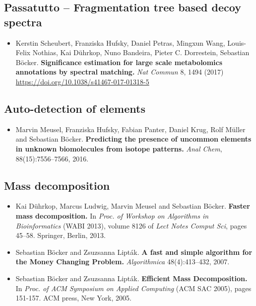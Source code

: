 \documentclass[letterpaper,10pt,openany,oneside]{sphinxmanual}
\begin{document}
\subsection*{Passatutto -- Fragmentation tree based decoy spectra}
\label{introduction:passatutto}
\begin{itemize}
	\item Kerstin Scheubert, Franziska Hufsky, Daniel Petras, Mingxun Wang, Louis-Felix Nothias, Kai Dührkop, Nuno Bandeira, Pieter C. Dorrestein, Sebastian Böcker.
	\textbf{Significance estimation for large scale metabolomics annotations by spectral matching.}
	\emph{Nat Commun} 8, 1494 (2017)  \url{https://doi.org/10.1038/s41467-017-01318-5}
\end{itemize}

\subsection*{Auto-detection of elements}
\label{introduction:auto-detection-of-elements}

\begin{itemize}
\item Marvin Meusel, Franziska Hufsky, Fabian Panter, Daniel Krug, Rolf Müller and Sebastian Böcker.
\textbf{Predicting the presence of uncommon elements in unknown biomolecules from isotope patterns.}
\emph{Anal Chem}, 88(15):7556--7566, 2016. 
\end{itemize}

\subsection*{Mass decomposition}
\label{introduction:mass-decomposition}

\begin{itemize}
\item Kai Dührkop, Marcus Ludwig, Marvin Meusel and Sebastian Böcker.
\textbf{Faster mass decomposition.}
In \emph{Proc. of Workshop on Algorithms in Bioinformatics} (WABI 2013), volume 8126 of \emph{Lect Notes Comput Sci}, pages 45--58. Springer, Berlin, 2013.

\item Sebastian Böcker and Zsuzsanna Lipták.
\textbf{A fast and simple algorithm for the Money Changing Problem.}
\emph{Algorithmica} 48(4):413--432, 2007.

\item Sebastian Böcker and Zsuzsanna Lipták.
\textbf{Efficient Mass Decomposition.}
In \emph{Proc. of ACM Symposium on Applied Computing} (ACM SAC 2005), pages 151-157. ACM press, New York, 2005. 
\end{itemize}
\end{document}
